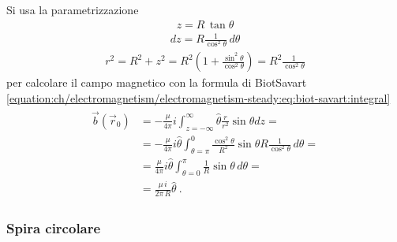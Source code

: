 \documentclass[letterpaper,10pt,italian]{jupyterBook}
\begin{document}
\sphinxAtStartPar
Si usa la parametrizzazione
\begin{equation*}
\begin{split}z = R \, \tan \theta\end{split}
\end{equation*}\begin{equation*}
\begin{split}dz = R \frac{1}{\cos^2 \theta} \, d \theta\end{split}
\end{equation*}\begin{equation*}
\begin{split}r^2 = R^2 + z^2 = R^2 \left(1+\frac{\sin^2 \theta}{\cos^2 \theta} \right) = R^2 \frac{1}{\cos^2 \theta}\end{split}
\end{equation*}
\sphinxAtStartPar
per calcolare il campo magnetico con la formula di Biot\sphinxhyphen{}Savart \eqref{equation:ch/electromagnetism/electromagnetism-steady:eq:biot-savart:integral}
\begin{equation*}
\begin{split}\begin{aligned}
  \vec{b}(\vec{r}_0) & = - \frac{\mu}{4 \pi} i \int_{z=-\infty}^{\infty} \hat{\theta} \frac{r}{r^2} \sin \theta dz = \\
                     & = - \frac{\mu}{4 \pi} i \hat{\theta} \int_{\theta=\pi}^{0} \frac{\cos^2 \theta}{R^2} \sin \theta R \frac{1}{\cos^2 \theta} \, d \theta = \\
                     & =   \frac{\mu}{4 \pi} i \hat{\theta} \int_{\theta=0}^{\pi} \frac{1}{R} \sin \theta \, d \theta = \\
                     & =   \frac{\mu \, i}{2 \pi \, R} \hat{\theta} \ .
\end{aligned}\end{split}
\end{equation*}\subsubsection*{Spira circolare}
\end{document}
